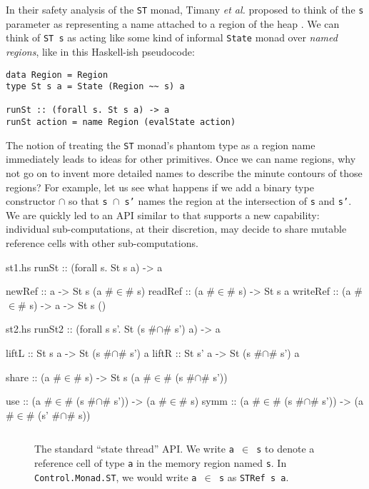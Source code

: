 \documentclass[format=sigplan, review=false, screen=true, 10pt]{acmart}
\begin{document}
In their safety analysis of the \texttt{ST} monad, Timany \textit{et al.} proposed to think of the \texttt{s} parameter as
representing a name attached to a region of the heap \cite{timany2017logical}.
We can think of \texttt{ST s} as acting like some kind of informal \texttt{State} monad over
\emph{named regions}, like in this Haskell-ish pseudocode:
\begin{verbatim}
data Region = Region
type St s a = State (Region ~~ s) a

runSt :: (forall s. St s a) -> a
runSt action = name Region (evalState action)
\end{verbatim}

The notion of treating the \texttt{ST} monad's phantom type as a region name immediately leads to ideas for
other primitives. Once we can name regions, why not go on to invent more detailed names to describe
the minute contours of those regions? For example, let us see what happens if we add a binary type constructor $\cap$ so that \texttt{s $\cap$ s'}
names the region at the intersection of \texttt{s} and \texttt{s'}. We are quickly led to an API similar to  that
supports a new capability: individual sub-computations, at their discretion, may decide to share mutable reference cells with other sub-computations.



\begin{filecontents*}{st1.hs}
runSt    :: (forall s. St s a) -> a

newRef   :: a -> St s (a #$\in$# s)
readRef  :: (a #$\in$# s) -> St s a
writeRef :: (a #$\in$# s) -> a -> St s ()
\end{filecontents*}

\begin{filecontents*}{st2.hs}
runSt2 :: (forall s s'. St (s #$\cap$# s') a) -> a

liftL :: St s a -> St (s #$\cap$# s') a
liftR :: St s' a -> St (s #$\cap$# s') a

share :: (a #$\in$# s) -> St s (a #$\in$# (s #$\cap$# s'))

use  :: (a #$\in$# (s #$\cap$# s')) -> (a #$\in$# s)
symm :: (a #$\in$# (s #$\cap$# s')) -> (a #$\in$# (s' #$\cap$# s))
\end{filecontents*}

\begin{figure}[b]
  \inputminted{haskell}{st1.hs}
  \caption{The standard ``state thread'' API. We write \texttt{a $\in$ s} to
    denote a reference cell of type \texttt{a} in the memory region named \texttt{s}.
    In \texttt{Control.Monad.ST}, we would write \texttt{a $\in$ s} as
    \texttt{STRef s a}.\label{st-api}}
\end{figure}
\end{document}
